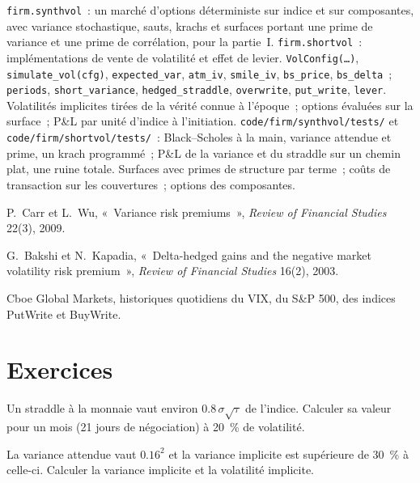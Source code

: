 \begin{build}
 \texttt{firm.synthvol}~: un marché d'options déterministe sur indice et sur composantes, avec variance stochastique, sauts, krachs et surfaces portant
une prime de variance et une prime de corrélation, pour la partie~I. \texttt{firm.shortvol}~: implémentations de vente de volatilité et effet de levier.
 \texttt{VolConfig(\dots)}, \texttt{simulate\_vol(cfg)}, \texttt{expected\_var}, \texttt{atm\_iv}, \texttt{smile\_iv}, \texttt{bs\_price},
\texttt{bs\_delta}~; \texttt{periods}, \texttt{short\_variance}, \texttt{hedged\_straddle}, \texttt{overwrite}, \texttt{put\_write}, \texttt{lever}.
 Volatilités implicites tirées de la vérité connue à l'époque~; options évaluées sur la surface~; P\&L par unité d'indice à l'initiation.
 \texttt{code/firm/synthvol/tests/} et \texttt{code/firm/shortvol/tests/}~: Black--Scholes à la main, variance attendue et
prime, un krach programmé~; P\&L de la variance et du straddle sur un chemin plat, une ruine totale.
 Surfaces avec primes de structure par terme~; coûts de transaction sur les couvertures~; options des composantes.
\end{build}

\begin{omsources}
\item P.~Carr et L.~Wu, «~Variance risk premiums~», \emph{Review of Financial Studies} 22(3), 2009.
\item G.~Bakshi et N.~Kapadia, «~Delta-hedged gains and the negative market volatility risk premium~», \emph{Review of Financial Studies} 16(2), 2003.
\item Cboe Global Markets, historiques quotidiens du VIX, du S\&P 500, des indices PutWrite et BuyWrite.
\end{omsources}

\section{Exercices}

\begin{exercise}[$\star$]\label{exo:s2:harvesting-the-variance-risk-premium:1}
Un straddle à la monnaie vaut environ $0.8\,\sigma\sqrt{\tau}$ de l'indice. Calculer sa valeur pour un mois (21 jours de négociation) à 20~\% de volatilité.
\end{exercise}

\begin{exercise}[$\star$]\label{exo:s2:harvesting-the-variance-risk-premium:2}
La variance attendue vaut $0.16^2$ et la variance implicite est supérieure de 30~\% à celle-ci. Calculer la variance implicite et la volatilité implicite.
\end{exercise}


